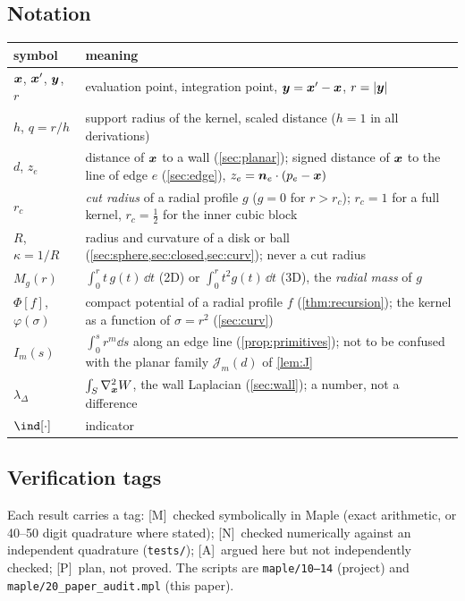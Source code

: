 \subsection{Notation}\label{sec:notation}
\begin{center}\small
\begin{tabular}{lp{11.4cm}}
\toprule
symbol & meaning\\
\midrule
$\bm x$, $\bm x'$, $\bm y$, $r$ & evaluation point, integration point, $\bm y=\bm x'-\bm x$, $r=|\bm y|$\\
$h$, $q=r/h$ & support radius of the kernel, scaled distance ($h=1$ in all derivations)\\
$d$, $z_e$ & distance of $\bm x$ to a wall (\cref{sec:planar}); signed distance of $\bm x$ to the line of edge $e$ (\cref{sec:edge}), $z_e=\bm n_e\cdot(p_e-\bm x)$\\
$r_c$ & \emph{cut radius} of a radial profile $g$ ($g=0$ for $r>r_c$); $r_c=1$ for a full kernel, $r_c=\frac12$ for the inner cubic block\\
$R$, $\kappa=1/R$ & radius and curvature of a disk or ball (\cref{sec:sphere,sec:closed,sec:curv}); never a cut radius\\
$M_g(r)$ & $\int_0^rt\,g(t)\,\dd t$ (2D) or $\int_0^rt^2g(t)\,\dd t$ (3D), the \emph{radial mass} of $g$\\
$\Phi[f]$, $\varphi(\sigma)$ & compact potential of a radial profile $f$ (\cref{thm:recursion}); the kernel as a function of $\sigma=r^2$ (\cref{sec:curv})\\
$I_m(s)$ & $\int_0^sr^m\dd s$ along an edge line (\cref{prop:primitives}); not to be confused with the
planar family $\mathcal J_m(d)$ of \cref{lem:J}\\
$\lambda_\Delta$ & $\int_S\nabla^2_{\bm x}W$, the wall Laplacian (\cref{sec:wall}); a number, not a difference\\
$\ind[\cdot]$ & indicator\\
\bottomrule
\end{tabular}
\end{center}

\subsection{Verification tags}
Each result carries a tag: \textsf{[M]}~checked symbolically in Maple (exact arithmetic, or 40--50 digit
quadrature where stated); \textsf{[N]}~checked numerically against an independent quadrature
(\texttt{tests/}); \textsf{[A]}~argued here but not independently checked; \textsf{[P]}~plan, not proved.
The scripts are \texttt{maple/10--14} (project) and \texttt{maple/20\_paper\_audit.mpl} (this paper).
